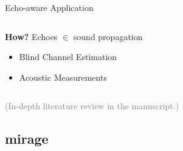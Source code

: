 \begin{frame}{Echo-aware Application}
\begin{columns}[T,onlytextwidth]
        \pause[7]
        \begin{block}{\textbf{How?}}
            \small
            Echoes $\in$ sound propagation
            \begin{itemize}
                \item Blind Channel Estimation
                \\{\footnotesize\cite{lin2007blind,crocco2017uncalibrated}}
                \item Acoustic Measurements
                \\{\footnotesize\cite{eaton2015ace,kuttruff2016room}}
            \end{itemize}
        \end{block}
    \end{columns}

    \begin{center}
        \textcolor{gray}{\small (In-depth literature review in the manuscript.)}
    \end{center}
\end{frame}

\subsection{mirage}

